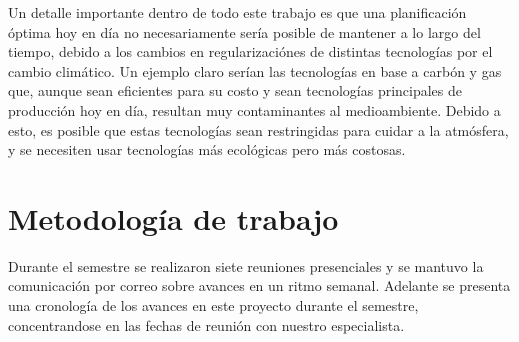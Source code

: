 \documentclass[12pt,twoside]{article}
\begin{document}
	\hspace{1cm} Un detalle importante dentro de todo este trabajo es que una planificaci\'on \'optima hoy en d\'ia no necesariamente ser\'ia posible de mantener a lo largo del tiempo, debido a los cambios en regularizaci\'ones de distintas tecnolog\'ias por el cambio clim\'atico. Un ejemplo claro ser\'ian las tecnolog\'ias en base a carb\'on y gas que, aunque sean eficientes para su costo y sean tecnolog\'ias principales de producci\'on hoy en d\'ia, resultan muy contaminantes al medioambiente. Debido a esto, es posible que estas tecnolog\'ias sean restringidas para cuidar a la atm\'osfera, y se necesiten usar tecnolog\'ias m\'as ecol\'ogicas pero m\'as costosas.
	
	\newpage
	\section{Metodolog\'ia de trabajo}
	
	Durante el semestre se realizaron siete reuniones presenciales y se mantuvo la comunicaci\'on por correo sobre avances en un ritmo semanal. Adelante se presenta una cronolog\'ia de los avances en este proyecto durante el semestre, concentrandose en las fechas de reuni\'on con nuestro especialista. 
	
\end{document}
